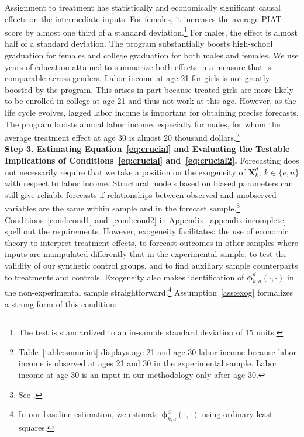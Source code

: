 Assignment to treatment has statistically and economically significant causal effects on the intermediate inputs. For females, it increases the average PIAT score by almost one third of a standard deviation.\footnote{The test is standardized to an in-sample standard deviation of 15 units.} For males, the effect is almost half of a standard deviation. The program substantially boosts high-school graduation for females and college graduation for both males and females. We use years of education attained to summarize both effects in a measure that is comparable across genders. Labor income at age 21 for girls is not greatly boosted by the program. This arises in part because treated girls are more likely to be enrolled in college at age 21 and thus not work at this age. However, as the life cycle evolves, lagged labor income is important for obtaining precise forecasts. The program boosts annual labor income, especially for males, for whom the average treatment effect at age 30 is almost 20 thousand dollars.\footnote{Table~\ref{table:summint} displays age-21 and age-30 labor income because labor income is observed at ages 21 and 30 in the experimental sample. Labor income at age 30 is an input in our methodology only after age 30.}\\

\textbf{Step 3. Estimating Equation~\eqref{eq:crucial} and Evaluating the Testable Implications of Conditions~\eqref{eq:crucial} and~\eqref{eq:crucial2}.} Forecasting does not necessarily require that we take a position on the exogeneity of $\bm{X}^d_k, \: k \in \{e,n\}$ with respect to labor income. Structural models based on biased parameters can still give reliable forecasts if relationships between observed and unobserved variables are the same within sample and in the forecast sample.\footnote{See \cite{Liu-etal-2016-USC-Data-Models}.} Conditions~\ref{cond:cond1} and~\ref{cond:cond2} in Appendix~\ref{appendix:incomplete} spell out the requirements. However, exogeneity facilitates: the use of economic theory to interpret treatment effects, to forecast outcomes in other samples where inputs are manipulated differently that in the experimental sample, to test the validity of our synthetic control groups, and to find auxiliary sample counterparts to treatments and controls. Exogeneity also makes identification of $\bm{\phi}^d_{k,a}\left( \cdot, \cdot \right)$ in the non-experimental sample straightforward.\footnote{In our baseline estimation, we estimate $\bm{\phi}^d_{k,a}\left( \cdot, \cdot \right)$ using ordinary least squares.} Assumption~\ref{ass:exog} formalizes a strong form of this condition:


